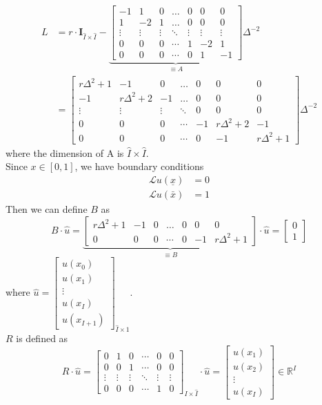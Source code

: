 \documentclass[11pt]{article}
\newcommand{\R}{\ensuremath{\mathbb{R}}}
\begin{document}
\begin{align*}
L &= r\cdot \mathbf{I}_{\hat{I}\times\hat{I}}-\underbrace{\begin{bmatrix}
-1&1&0&\dots&0&0&0\\
1&-2&1&\dots&0&0&0\\
\vdots&\vdots&\vdots&\ddots&\vdots&\vdots&\vdots\\
0&0&0&\cdots&1&-2&1\\
0&0&0&\cdots&0&1&-1
\end{bmatrix}}_{\equiv A}\Delta^{-2}
\\
& = \begin{bmatrix}
r\Delta^2+1&-1&0&\dots&0&0&0\\
-1&r\Delta^2+2&-1&\dots&0&0&0\\
\vdots&\vdots&\vdots&\ddots&0&0&0\\
0&0&0&\cdots&-1&r\Delta^2+2&-1\\
0&0&0&\cdots&0&-1&r\Delta^2+1
\end{bmatrix}\Delta^{-2}
\end{align*}
where the dimension of A is $\hat{I}\times\hat{I}$.\\
Since $x\in[0, 1]$, we have boundary conditions 
\begin{align}
\mathcal{L} u(\underline{x}) &= 0\\
\mathcal{L} u(\bar{x})& = 1
\end{align}
Then we can define $B$ as
\begin{equation}
B\cdot\hat{u} =\underbrace{\begin{bmatrix}
r\Delta^2+1&-1&0&\dots&0&0&0\\
0&0&0&\cdots&0&-1&r\Delta^2+1
\end{bmatrix}}_{\equiv B}\cdot\hat{u} = \begin{bmatrix}
0\\
1
\end{bmatrix}
\end{equation}
where $\hat{u} = \begin{bmatrix}
u(x_0)\\
u(x_1)\\
\vdots\\
u(x_I)\\
u(x_{I+1})
\end{bmatrix}_{\hat{I}\times 1}$.\\
$R$ is defined as 
\begin{equation}
R\cdot \hat{u} =\begin{bmatrix}
0&1&0&\cdots&0&0\\
0&0&1&\cdots&0&0\\
\vdots&\vdots&\vdots&\ddots&\vdots&\vdots\\
0&0&0&\cdots&1&0
\end{bmatrix}_{I\times\hat{I}}\cdot \hat{u}		 
=\begin{bmatrix}
u(x_1)\\
u(x_2)\\
\vdots\\
u(x_I)
\end{bmatrix} \in \R^{I} 
\end{equation}
\end{document}
